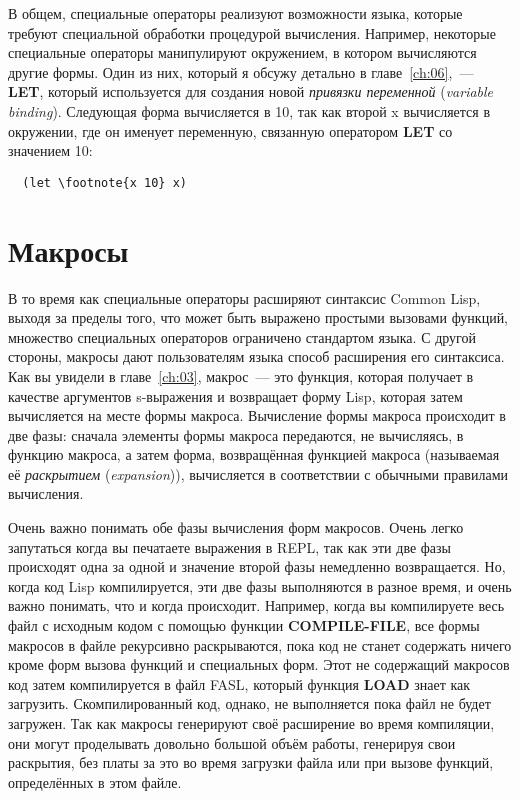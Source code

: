 В общем, специальные операторы реализуют возможности языка, которые требуют специальной
обработки процедурой вычисления. Например, некоторые специальные операторы манипулируют
окружением, в котором вычисляются другие формы. Один из них, который я обсужу детально в
главе~\ref{ch:06},~--- \textbf{LET}, который используется для создания новой \textit{привязки
  переменной} (\textit{variable binding}). Следующая форма вычисляется в 10, так как
второй x вычисляется в окружении, где он именует переменную, связанную оператором
\textbf{LET} со значением 10:

\begin{lstlisting}
  (let \footnote{x 10} x)
\end{lstlisting}

\section{Макросы}

В то время как специальные операторы расширяют синтаксис Common Lisp, выходя за пределы
того, что может быть выражено простыми вызовами функций, множество специальных операторов
ограничено стандартом языка. С другой стороны, макросы дают пользователям языка способ
расширения его синтаксиса. Как вы увидели в главе~\ref{ch:03}, макрос~--- это функция, которая
получает в качестве аргументов s-выражения и возвращает форму Lisp, которая затем
вычисляется на месте формы макроса. Вычисление формы макроса происходит в две фазы:
сначала элементы формы макроса передаются, не вычисляясь, в функцию макроса, а затем
форма, возвращённая функцией макроса (называемая её \textit{раскрытием}
(\textit{expansion})), вычисляется в соответствии с обычными правилами вычисления.

Очень важно понимать обе фазы вычисления форм макросов. Очень легко запутаться когда вы
печатаете выражения в REPL, так как эти две фазы происходят одна за одной и значение
второй фазы немедленно возвращается. Но, когда код Lisp компилируется, эти две фазы
выполняются в разное время, и очень важно понимать, что и когда происходит. Например,
когда вы компилируете весь файл с исходным кодом с помощью функции \textbf{COMPILE-FILE},
все формы макросов в файле рекурсивно раскрываются, пока код не станет содержать ничего
кроме форм вызова функций и специальных форм. Этот не содержащий макросов код затем
компилируется в файл FASL, который функция \textbf{LOAD} знает как
загрузить. Скомпилированный код, однако, не выполняется пока файл не будет загружен. Так
как макросы генерируют своё расширение во время компиляции, они могут проделывать довольно
большой объём работы, генерируя свои раскрытия, без платы за это во время загрузки файла
или при вызове функций, определённых в этом файле.

